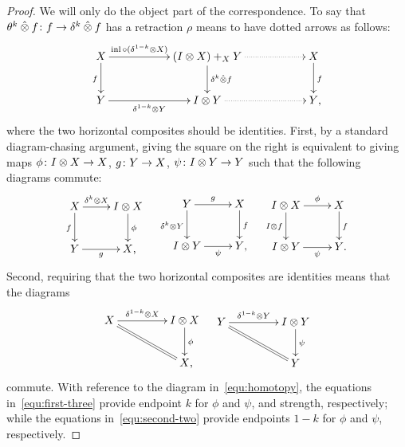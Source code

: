 \documentclass[reqno,10pt,a4paper,oneside,draft]{amsart}
\begin{document}
\begin{proof}
We will only do the object part of the correspondence.
To say that $\theta^k \mathbin{\hat{\otimes}} f \colon f \to \delta^k \mathbin{\hat{\otimes}} f$ has a retraction $\rho$ means to have dotted arrows as follows:
\[
\xymatrix@C+3em{
  X
  \ar[r]^-{\inl \cc (\kcylinv \otimes X)}
  \ar[d]_f
&
  (\interval \otimes X) +_X Y
  \ar[d]^{\kcyl \hatotimes f}
  \ar@{.>}[r]
&
  X
  \ar[d]^f
\\
  Y
  \ar[r]_-{\kcylinv \otimes Y}
&
  \interval \otimes Y
  \ar@{.>}[r]
&
  Y
\rlap{,}}
\]
where the two horizontal composites should be identities.
First, by a standard diagram-chasing argument, giving the square on the right is equivalent to giving maps $\phi \colon I \otimes X \to X$, $g \colon Y \to X$, $\psi \colon I \otimes Y \to Y$ such that the following diagrams commute:
\begin{align} \label{equ:first-three}
\begin{gathered}
\xymatrix{
  X
  \ar[r]^-{\kcyl \otimes X}
  \ar[d]_f
&
  \interval \otimes X
  \ar[d]^{\phi}
\\
  Y \ar[r]_-{g}
&
  X
\rlap{,}}
\end{gathered}
&&
\begin{gathered}
\xymatrix{
  Y
  \ar[r]^-g
  \ar[d]_{\kcyl \otimes Y}
&
  X
  \ar[d]^f
\\
  \interval \otimes Y
  \ar[r]_-{\psi}
&
  Y
\rlap{,}}
\end{gathered}
&&
\begin{gathered}
\xymatrix{
  \interval \otimes X
  \ar[r]^-\phi
  \ar[d]_{I \otimes f}
&
  X
  \ar[d]^{f}
\\
  \interval \otimes Y
  \ar[r]_-{\psi}
&
  Y
\rlap{.}}
\end{gathered}
\end{align}
Second, requiring that the two horizontal composites are identities means that the diagrams
\begin{align} \label{equ:second-two}
\begin{gathered}
\xymatrix@C+2em{
  X
  \ar[r]^-{\kcylinv \otimes X}
  \ar@{=}[dr]
&
  \interval \otimes X
  \ar[d]^\phi
\\&
  X
\rlap{,}}
\end{gathered}
&&
\begin{gathered}
\xymatrix@C+2em{
  Y
  \ar[r]^-{\kcylinv \otimes Y}
  \ar@{=}[dr]
&
  \interval \otimes Y
  \ar[d]^{\psi}
\\&
  Y
}
\end{gathered}
\end{align}
commute.
With reference to the diagram in~\eqref{equ:homotopy}, the equations in~\eqref{equ:first-three} provide endpoint $k$ for $\phi$ and $\psi$, and strength, respectively; while the equations in~\eqref{equ:second-two} provide endpoints $1-k$ for $\phi$ and $\psi$, respectively.
\end{proof}
\end{document}
